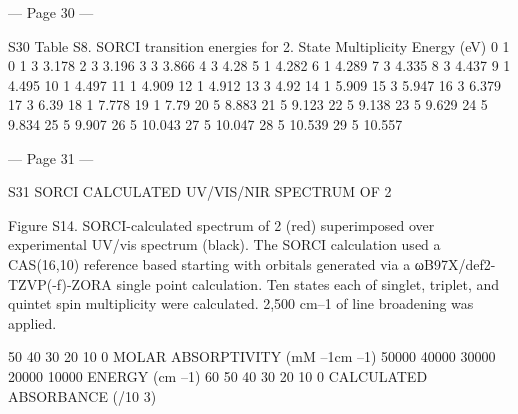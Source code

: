  
 
 
 
 
 
 
 
 
 
 
 
 
 
 


--- Page 30 ---
 
S30 
Table S8. SORCI transition energies for 2. 
State 
Multiplicity 
Energy (eV) 
0 
1 
0 
1 
3 
3.178 
2 
3 
3.196 
3 
3 
3.866 
4 
3 
4.28 
5 
1 
4.282 
6 
1 
4.289 
7 
3 
4.335 
8 
3 
4.437 
9 
1 
4.495 
10 
1 
4.497 
11 
1 
4.909 
12 
1 
4.912 
13 
3 
4.92 
14 
1 
5.909 
15 
3 
5.947 
16 
3 
6.379 
17 
3 
6.39 
18 
1 
7.778 
19 
1 
7.79 
20 
5 
8.883 
21 
5 
9.123 
22 
5 
9.138 
23 
5 
9.629 
24 
5 
9.834 
25 
5 
9.907 
26 
5 
10.043 
27 
5 
10.047 
28 
5 
10.539 
29 
5 
10.557 
 
 


--- Page 31 ---
 
S31 
SORCI CALCULATED UV/VIS/NIR SPECTRUM OF 2 
 
 
Figure S14. SORCI-calculated spectrum of 2 (red) superimposed over experimental UV/vis 
spectrum (black). The SORCI calculation used a CAS(16,10) reference based starting with 
orbitals generated via a ωB97X/def2-TZVP(-f)-ZORA single point calculation. Ten states each 
of singlet, triplet, and quintet spin multiplicity were calculated. 2,500 cm–1 of line broadening 
was applied. 
 
50
40
30
20
10
0
MOLAR ABSORPTIVITY (mM
–1cm
–1)
50000
40000
30000
20000
10000
ENERGY (cm
–1)
60
50
40
30
20
10
0
CALCULATED ABSORBANCE (/10
3)